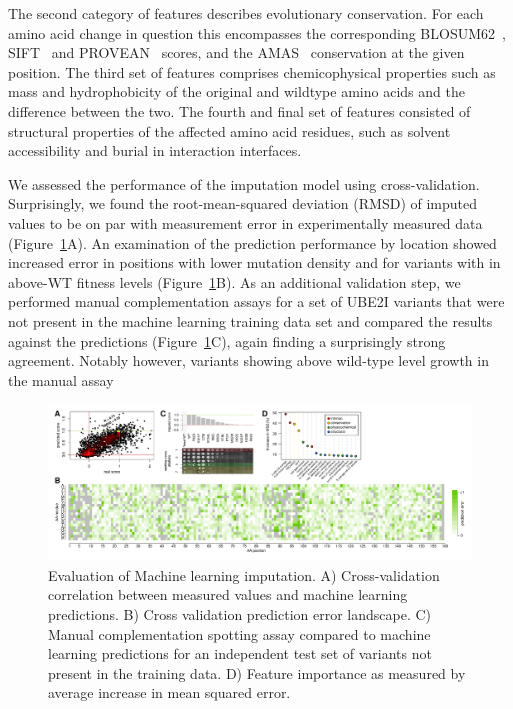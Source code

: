 The second category of features describes evolutionary conservation. For each amino acid change in question this encompasses the corresponding BLOSUM62~\cite{henikoff_amino_1992}, SIFT~\cite{ng_predicting_2001} and PROVEAN~\cite{choi_predicting_2012} scores, and the AMAS~\cite{livingstone_protein_1993} conservation at the given position. The third set of features comprises chemicophysical properties such as mass and hydrophobicity of  the original and wildtype amino acids and the difference between the two. The fourth and final set of features consisted of structural properties of the affected amino acid residues, such as solvent accessibility and burial in interaction interfaces.

We assessed the performance of the imputation model using cross-validation. Surprisingly, we found the root-mean-squared deviation (RMSD) of imputed values to be on par with measurement error in experimentally measured data (Figure~\ref{fig:imputation}A). An examination of the prediction performance by location showed increased error in positions with lower mutation density and for variants with in above-WT fitness levels (Figure~\ref{fig:imputation}B). As an additional validation step, we performed manual complementation assays for a set of UBE2I variants that were not present in the machine learning training data set and compared the results against the predictions (Figure~\ref{fig:imputation}C), again finding a surprisingly strong agreement. Notably however, variants showing above wild-type level growth in the manual assay

\begin{landscape}
\begin{figure}[h]
	\centering
	\includegraphics[width=9in]{img/imputation.pdf}
	\caption{Evaluation of Machine learning imputation. A) Cross-validation correlation between measured values and machine learning predictions. B) Cross validation prediction error landscape. C) Manual complementation spotting assay compared to machine learning predictions for an independent test set of variants not present in the training data. D) Feature importance as measured by average increase in mean squared error.}
	\label{fig:imputation}
\end{figure}
\end{landscape}

